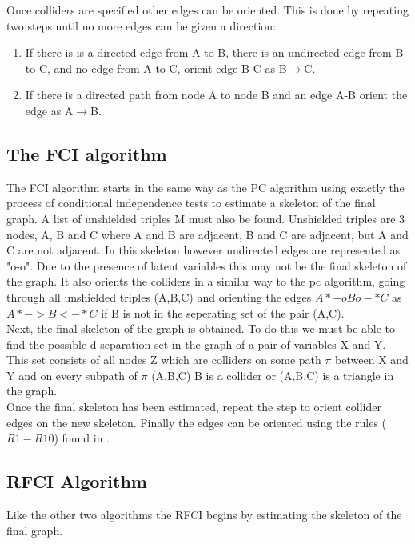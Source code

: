 \documentclass{article}
\begin{document}
Once colliders are specified other edges can be oriented. This is done by repeating two steps until no more edges can be given a direction:
\\

\begin{enumerate}[i]
  \item If there is is a directed edge from A to B, there is an undirected edge from B to C, and no edge from A to C, orient edge B-C as B$\rightarrow$C.
  \item If there is a directed path from node A to node B and an edge A-B orient the edge as A$\rightarrow$B\cite{spirtes1991algorithm}. 
\end{enumerate}


\subsection{The FCI algorithm}

The FCI algorithm starts in the same way as the PC algorithm using exactly the process of conditional independence tests to estimate a skeleton of the final graph. A list of unshielded triples M must also be found. Unshielded triples are 3 nodes, A, B and C where A and B are adjacent, B and C are adjacent, but A and C are not adjacent. In this skeleton however undirected edges are represented as "o-o". Due to the presence of latent variables this may not be the final skeleton of the graph. It also orients the colliders in a similar way to the pc algorithm, going through all unshielded triples (A,B,C) and orienting the edges $A*-oBo-*C$ as $A*->B<-*C$ if B is not in the seperating set of the pair (A,C).
\\

Next, the final skeleton of the graph is obtained. To do this we must be able to find the possible d-separation set in the graph of a pair of variables X and Y. This set consists of all nodes Z which are colliders on some path $\pi$ between X and Y and on every subpath of $\pi$ (A,B,C) B is a collider or (A,B,C) is a triangle in the graph.
\\

Once the final skeleton has been estimated, repeat the step to orient collider edges on the new skeleton. Finally the edges can be oriented using the rules ($R1-R10$) found in \cite{ZHANG20081873}.\cite{colombo2012learning}
\\


\subsection{RFCI Algorithm}
Like the other two algorithms the RFCI begins by estimating the skeleton of the final graph.
\\
\end{document}
